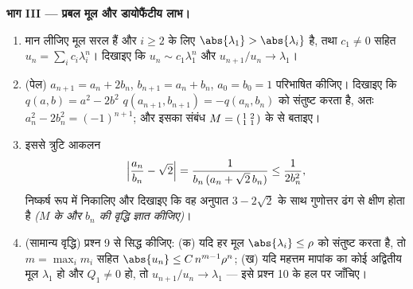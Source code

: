 \begin{problem}[{सप्ताहांत समस्या --- रैखिक पुनरावृत्तियों की
मूल प्रमेय}]
\medskip
\noindent\textbf{भाग III --- प्रबल मूल और डायोफैंटीय लाभ।}
\begin{enumerate}[resume]
  \item मान लीजिए मूल सरल हैं और $i \geq 2$ के लिए $\abs{\lambda_1} >
        \abs{\lambda_i}$ है, तथा $c_1 \neq 0$ सहित $u_n = \sum_i c_i
        \lambda_i^n$।
        दिखाइए कि $u_n \sim
        c_1\lambda_1^n$ और $u_{n+1}/u_n \to \lambda_1$।
  \item (पेल) $a_{n+1} = a_n + 2b_n$, $b_{n+1} = a_n +
        b_n$, $a_0 = b_0 = 1$ परिभाषित कीजिए। दिखाइए कि $q(a, b) = a^2 - 2b^2$ $q(a_{n+1}, b_{n+1}) = -q(a_n, b_n)$ को
        संतुष्ट करता है, अतः $a_n^2 - 2b_n^2 = (-1)^{n+1}$; और इसका संबंध $M = \begin{psmallmatrix}1 & 2\\ 1 &
        1\end{psmallmatrix}$ के  से
        बताइए।
  \item इससे त्रुटि आकलन
        \[
        \Bigl|\frac{a_n}{b_n} - \sqrt2\Bigr|
        = \frac{1}{b_n\,(a_n + \sqrt2\,b_n)}
        \leq \frac{1}{2b_n^2},
        \]
        निष्कर्ष रूप में निकालिए और दिखाइए कि वह अनुपात $3 -
        2\sqrt2$ के साथ
        गुणोत्तर ढंग से क्षीण होता है \emph{($M$ के 
        और $b_n$ की वृद्धि ज्ञात कीजिए)}।
  \item (सामान्य वृद्धि) प्रश्न 9 से सिद्ध कीजिए: (क) यदि हर मूल $\abs{\lambda_i} \leq \rho$
        को संतुष्ट करता है, तो $m = \max_i m_i$ सहित $\abs{u_n} \leq C\,n^{m-1}\rho^n$; (ख) यदि महत्तम मापांक
        का कोई अद्वितीय मूल $\lambda_1$ हो और $Q_1 \neq 0$ हो, तो $u_{n+1}/u_n \to
        \lambda_1$ --- इसे प्रश्न
        10 के हल पर जाँचिए।
\end{enumerate}


\end{problem}
